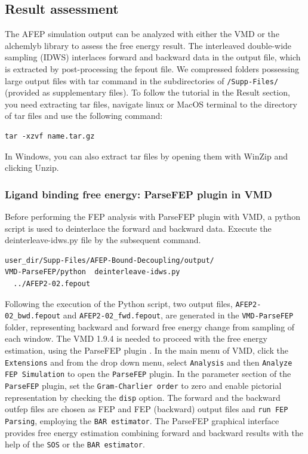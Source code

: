 \documentclass[9pt,tutorial]{livecoms}
\begin{document}
\subsection{Result assessment}
The AFEP simulation output can be analyzed with either the VMD or the alchemlyb library to assess the free energy result. The interleaved double-wide sampling (IDWS) interlaces forward and backward data in the output file, which is extracted by post-processing the fepout file. We compressed folders possessing large output files with tar command in the subdirectories of \texttt{/Supp-Files/} (provided as supplementary files). To follow the tutorial in the Result section, you need extracting tar files, navigate linux or MacOS terminal to the directory of tar files and use the following command:
\begin{verbatim}
tar -xzvf name.tar.gz
\end{verbatim}
In Windows, you can also extract tar files by opening them with WinZip and clicking Unzip.
\subsubsection{Ligand binding free energy: ParseFEP plugin in VMD}
Before performing the FEP analysis with ParseFEP plugin \cite{Liu2012} with VMD, a python script is used to deinterlace the forward and backward data. Execute the deinterleave-idws.py file by the subsequent command.
\begin{verbatim}
user_dir/Supp-Files/AFEP-Bound-Decoupling/output/
VMD-ParseFEP/python  deinterleave-idws.py
  ../AFEP2-02.fepout
\end{verbatim}
Following the execution of the Python script, two output files, \texttt{AFEP2-02\_bwd.fepout} and \texttt{AFEP2-02\_fwd.fepout}, are generated in the \texttt{VMD-ParseFEP} folder, representing backward and forward free energy change from sampling of each window. The VMD 1.9.4 is needed to proceed with the free energy estimation, using the ParseFEP plugin \cite{Liu2012}.
In the main menu of VMD, click the \texttt{Extensions} and from the drop down menu, select \texttt{Analysis} and then \texttt{Analyze FEP Simulation} to open the \texttt{ParseFEP} plugin. In the parameter section of the \texttt{ParseFEP} plugin, set the \texttt{Gram-Charlier order} to zero and enable pictorial representation by checking the \texttt{disp} option. The forward and the backward outfep files are chosen as FEP and FEP (backward) output files and \texttt{run FEP Parsing}, employing the \texttt{BAR estimator}. The ParseFEP graphical interface provides free energy estimation combining forward and backward results with the help of the \texttt{SOS} or the \texttt{BAR estimator}. 
\end{document}
